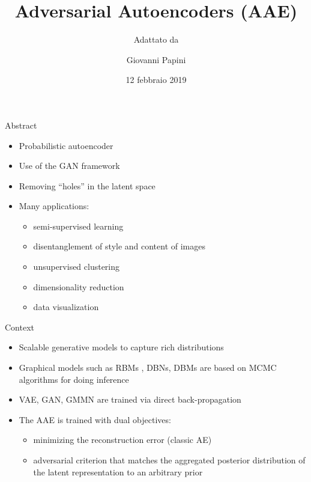 \documentclass[10pt]{beamer}
\begin{document}
\author{Giovanni Papini}
\title{Adversarial Autoencoders (AAE)}
\subtitle{Adattato da \cite{makhzani2015adversarial}}
\date{12 febbraio 2019}
\subject{autoencoders, neural network, AI}

\begin{frame}[plain]
\maketitle
\end{frame}

\begin{frame}{Abstract}
\begin{itemize}
  \item Probabilistic autoencoder
  \item Use of the GAN framework
  \item Removing ``holes'' in the latent space
  \item Many applications:
  \begin{itemize}
    \item semi-supervised learning
    \item disentanglement of style and content of images
    \item unsupervised clustering
    \item dimensionality reduction
    \item data visualization
  \end{itemize}
\end{itemize}
\end{frame}

\begin{frame}{Context}
\begin{itemize}
  \item Scalable generative models to capture rich distributions
  \item Graphical models such as RBMs , DBNs, DBMs are based on MCMC algorithms for doing inference
  \item VAE, GAN, GMMN are trained via direct back-propagation
  \item The AAE is trained with dual objectives:
  \begin{itemize}
    \item minimizing the reconstruction error (classic AE)
    \item adversarial criterion that matches the aggregated posterior distribution of the latent representation to an arbitrary prior
  \end{itemize}
\end{itemize}
\end{frame}
\end{document}
